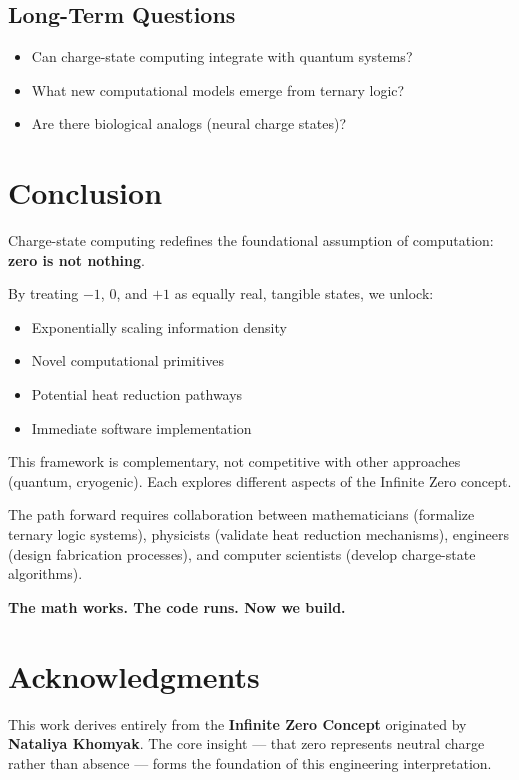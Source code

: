 \documentclass[11pt,a4paper]{article}
\begin{document}
\subsection{Long-Term Questions}

\begin{itemize}
\item Can charge-state computing integrate with quantum systems?
\item What new computational models emerge from ternary logic?
\item Are there biological analogs (neural charge states)?
\end{itemize}

\section{Conclusion}

Charge-state computing redefines the foundational assumption of computation: \textbf{zero is not nothing}.

By treating $-1$, $0$, and $+1$ as equally real, tangible states, we unlock:
\begin{itemize}
\item Exponentially scaling information density
\item Novel computational primitives
\item Potential heat reduction pathways
\item Immediate software implementation
\end{itemize}

This framework is complementary, not competitive with other approaches (quantum, cryogenic). Each explores different aspects of the Infinite Zero concept.

The path forward requires collaboration between mathematicians (formalize ternary logic systems), physicists (validate heat reduction mechanisms), engineers (design fabrication processes), and computer scientists (develop charge-state algorithms).

\textbf{The math works. The code runs. Now we build.}

\section*{Acknowledgments}

This work derives entirely from the \textbf{Infinite Zero Concept} originated by \textbf{Nataliya Khomyak}. The core insight --- that zero represents neutral charge rather than absence --- forms the foundation of this engineering interpretation.


\end{document}
